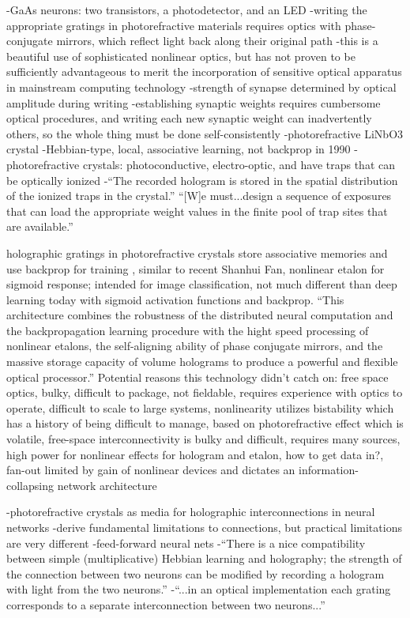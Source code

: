 -GaAs neurons: two transistors, a photodetector, and an LED
-writing the appropriate gratings in photorefractive materials requires optics with phase-conjugate mirrors, which reflect light back along their original path
-this is a beautiful use of sophisticated nonlinear optics, but has not proven to be sufficiently advantageous to merit the incorporation of sensitive optical apparatus in mainstream computing technology
-strength of synapse determined by optical amplitude during writing
-establishing synaptic weights requires cumbersome optical procedures, and writing each new synaptic weight can inadvertently others, so the whole thing must be done self-consistently
-photorefractive LiNbO3 crystal
-Hebbian-type, local, associative learning, not backprop in 1990
-photorefractive crystals: photoconductive, electro-optic, and have traps that can be optically ionized
-``The recorded hologram is stored in the spatial distribution of the ionized traps in the crystal.'' ``[W]e must...design a sequence of exposures that can load the appropriate weight values in the finite pool of trap sites that are available.''

\vspace{3em}
\cite{waps1987}
holographic gratings in photorefractive crystals store associative memories and use backprop for training \cite{waps1987}, similar to recent Shanhui Fan, nonlinear etalon for sigmoid response; intended for image classification, not much different than deep learning today with sigmoid activation functions and backprop. ``This architecture combines the robustness of the distributed neural computation and the backpropagation learning procedure with the hight speed processing of nonlinear etalons, the self-aligning ability of phase conjugate mirrors, and the massive storage capacity of volume holograms to produce a powerful and flexible optical processor.'' Potential reasons this technology didn't catch on: free space optics, bulky, difficult to package, not fieldable, requires experience with optics to operate, difficult to scale to large systems, nonlinearity utilizes bistability \cite{gi1985} which has a history of being difficult to manage, based on photorefractive effect which is volatile, free-space interconnectivity is bulky and difficult, requires many sources, high power for nonlinear effects for hologram and etalon, how to get data in?, fan-out limited by gain of nonlinear devices and dictates an information-collapsing network architecture

\vspace{3em}
\cite{psbr1988}
-photorefractive crystals as media for holographic interconnections in neural networks
-derive fundamental limitations to connections, but practical limitations are very different
-feed-forward neural nets
-``There is a nice compatibility between simple (multiplicative) Hebbian learning and holography; the strength of the connection between two neurons can be modified by recording a hologram with light from the two neurons.'' 
-``...in an optical implementation each grating corresponds to a separate interconnection between two neurons...''

